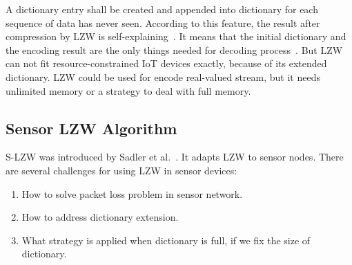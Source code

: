 A dictionary entry shall be created and appended into dictionary for each
sequence of data has never seen. According to this feature, the result after
compression by LZW is self-explaining~\cite{welch1984technique}. It means that
the initial dictionary and the encoding result are the only things needed for
decoding process~\cite{welch1984technique}. But LZW can not fit
resource-constrained IoT devices exactly, because of its extended dictionary.
LZW could be used for encode real-valued stream, but it needs unlimited memory
or a strategy to deal with full memory.

\subsection{Sensor LZW Algorithm}

S-LZW was introduced by Sadler et al.~\cite{sadler2006data}. It adapts LZW to
sensor nodes. There are several challenges for using LZW in sensor devices:
\begin{enumerate}
    \item How to solve packet loss problem in sensor network.
    \item How to address dictionary extension.
    \item What strategy is applied when dictionary is full, if we fix the size
    of dictionary.
\end{enumerate}

